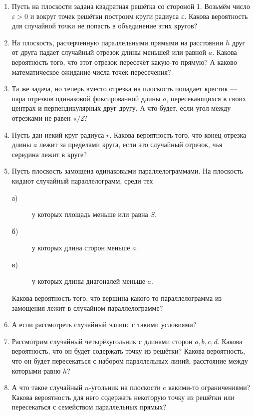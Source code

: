 \begin{enumerate}
\item Пусть на плоскости задана квадратная решётка со стороной 1. Возьмём число $\varepsilon>0$ и вокруг точек решётки построим круги радиуса $\varepsilon$. Какова вероятность для случайной точки не попасть в объединение этих кругов?

\item На плоскость, расчерченную параллельными прямыми на расстоянии $h$  друг от друга падает случайный отрезок длины меньшей или равной $a$. Какова вероятность того, что этот отрезок пересечёт какую-то прямую? А каково математическое ожидание числа точек пересечения?
\item Та же задача, но теперь вместо отрезка на плоскость попадает крестик --- пара отрезков одинаковой фиксированной длины $a$, пересекающихся в своих центрах и перпендикулярных друг-другу. А что будет, если угол между отрезками не равен $\text{π}/2$?
\item Пусть дан некий круг радиуса $r$. Какова вероятность того, что конец отрезка длины $a$ лежит за пределами круга, если это случайный отрезок, чья середина лежит в круге?
\item Пусть плоскость замощена одинаковыми параллелограммами. На плоскость кидают случайный параллелограмм, среди тех 
\begin{description}
\item[а)] у которых площадь меньше или равна $S$.
\item[б)] у которых длина сторон меньше $a$.
\item[в)] у которых длины диагоналей меньше $a$.
\end{description}
Какова вероятность того, что вершина какого-то параллелограмма из замощения лежит в случайном параллелограмме?
\item А если рассмотреть случайный эллипс с такими условиями?
\item Рассмотрим случайный четырёхугольник с длинами сторон $a, b, c, d$. Какова вероятность, что он будет содержать точку из решётки? Какова вероятность, что он будет пересекаться с набором параллельных линий, расстояние между которыми равно $h$?
\item А что такое случайный $n$-угольник на плоскости c какими-то ограничениями? Какова вероятность для него содержать некоторую точку из решётки или пересекаться с семейством параллельных прямых?
\end{enumerate}


